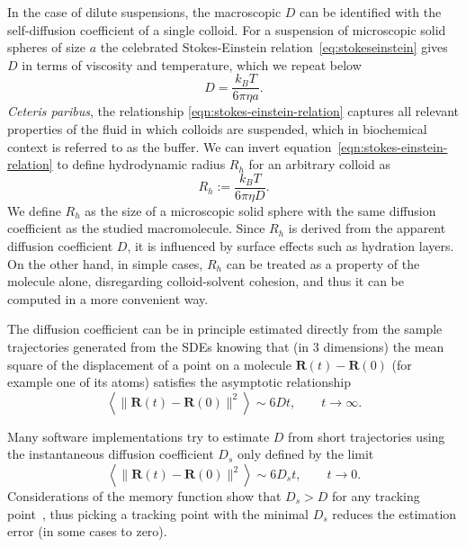 \documentclass{doctoral}
\begin{document}
In the case of dilute suspensions, the macroscopic $D$ can be identified with the self-diffusion coefficient of a single colloid.
For a suspension of microscopic solid spheres of size $a$ the celebrated Stokes-Einstein relation~\eqref{eq:stokeseinstein} gives $D$ in terms of viscosity and temperature, which we repeat below
\begin{equation}
    D = \frac{k_B T}{6 \pi \eta a}.
    \label{eqn:stokes-einstein-relation}
\end{equation}
\textit{Ceteris paribus}, the relationship \eqref{eqn:stokes-einstein-relation} captures all relevant properties of the fluid in which colloids are suspended, which in biochemical context is referred to as the buffer.
We can invert equation~\eqref{eqn:stokes-einstein-relation} to define hydrodynamic radius $R_h$ for an arbitrary colloid as
\begin{equation}
    R_h :=  \frac{k_B T}{6 \pi \eta D}.
    \label{eqn:hydrodynamic-radius-definition}
\end{equation}
We define $R_h$ as the size of a microscopic solid sphere with the same diffusion coefficient as the studied macromolecule.
Since $R_h$ is derived from the apparent diffusion coefficient $D$, it is influenced by surface effects such as hydration layers.
On the other hand, in simple cases, $R_h$ can be treated as a property of the molecule alone, disregarding colloid-solvent cohesion, and thus it can be computed in a more convenient way.

The diffusion coefficient can be in principle estimated directly from the sample trajectories generated from the SDEs knowing that (in 3 dimensions) the mean square of the displacement of a point on a molecule $\bm{R}(t) - \bm{R}(0)$ (for example one of its atoms) satisfies the asymptotic relationship
\begin{equation}
    \left< \lVert \bm{R}(t) - \bm{R}(0)\rVert^2 \right> \sim 6 D t, \quad \quad t \to \infty.
\end{equation}

Many software implementations try to estimate $D$ from short trajectories using the instantaneous diffusion coefficient $D_{s}$ only defined by the limit
\begin{equation}
    \left< \lVert \bm{R}(t) - \bm{R}(0)\rVert^2 \right> \sim 6 D_{s} t, \quad \quad t \to 0.
\end{equation}
Considerations of the memory function show that $D_{s} > D$ for any tracking point~\cite{Cichocki_2019}, thus picking a tracking point with the minimal $D_{s}$ reduces the estimation error (in some cases to zero).
\end{document}
